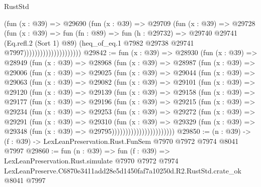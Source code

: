 \begin{lexlean}{RustStd}
\begin{coremodule}
                                    (fun (x : @39) =>
                                    @29690
                                      (fun (x : @39) =>
                                      @29709
                                        (fun (x : @39) =>
                                        @29728
                                          (fun (x : @39) =>
                                          fun (fn : @89) =>
                                          fun (h : @29732) =>
                                          @29740
                                            @29741
                                            (Eq.refl.{2} (Sort 1) @89)
                                            (heq_of_eq.{1}
                                              @7982
                                              @29738
                                              @29741
                                              @7997)))))))))))))))))))))
@29842 := fun (x : @39) =>
  @28930
    (fun (x : @39) =>
    @28949
      (fun (x : @39) =>
      @28968
        (fun (x : @39) =>
        @28987
          (fun (x : @39) =>
          @29006
            (fun (x : @39) =>
            @29025
              (fun (x : @39) =>
              @29044
                (fun (x : @39) =>
                @29063
                  (fun (x : @39) =>
                  @29082
                    (fun (x : @39) =>
                    @29101
                      (fun (x : @39) =>
                      @29120
                        (fun (x : @39) =>
                        @29139
                          (fun (x : @39) =>
                          @29158
                            (fun (x : @39) =>
                            @29177
                              (fun (x : @39) =>
                              @29196
                                (fun (x : @39) =>
                                @29215
                                  (fun (x : @39) =>
                                  @29234
                                    (fun (x : @39) =>
                                    @29253
                                      (fun (x : @39) =>
                                      @29272
                                        (fun (x : @39) =>
                                        @29291
                                          (fun (x : @39) =>
                                          @29310
                                            (fun (x : @39) =>
                                            @29329
                                              (fun (x : @39) =>
                                              @29348 (fun (x : @39) => @29795)))))))))))))))))))))))
@29850 := (n : @39) -> (f : @39) -> LexLeanPreservation.Rust.FunSem @7970 @7972 @7974 @8041 @7997
@29860 := fun (n : @39) =>
  fun (f : @39) =>
  LexLeanPreservation.Rust.simulate
    @7970
    @7972
    @7974
    LexLeanPreserve.C6870e3411add28e5d1450faf7a10250d.R2.RustStd.crate_ok
    @8041
    @7997
\end{coremodule}
\end{lexlean}
